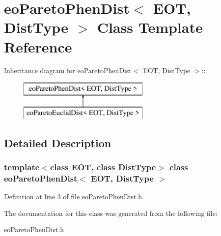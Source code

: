 \section{eo\-Pareto\-Phen\-Dist$<$ EOT, Dist\-Type $>$ Class Template Reference}
\label{classeoParetoPhenDist}
Inheritance diagram for eo\-Pareto\-Phen\-Dist$<$ EOT, Dist\-Type $>$::\begin{figure}[H]
\begin{center}
\leavevmode
\includegraphics[height=2cm]{classeoParetoPhenDist}
\end{center}
\end{figure}


\subsection{Detailed Description}
\subsubsection*{template$<$class EOT, class Dist\-Type$>$ class eo\-Pareto\-Phen\-Dist$<$ EOT, Dist\-Type $>$}





Definition at line 3 of file eo\-Pareto\-Phen\-Dist.h.

The documentation for this class was generated from the following file:\begin{CompactItemize}
\item 
eo\-Pareto\-Phen\-Dist.h\end{CompactItemize}
